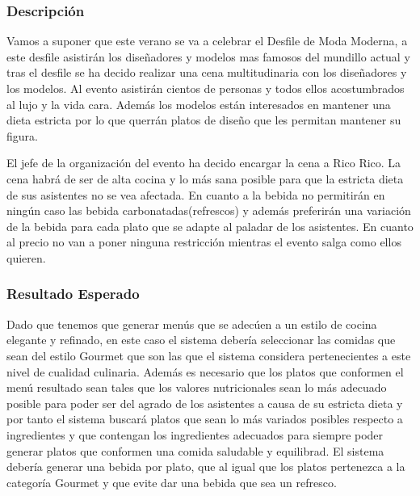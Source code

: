 \documentclass{article}
\begin{document}
\subsubsection{Descripción}
Vamos a suponer que este verano se va a celebrar el Desfile de Moda Moderna, a este desfile asistirán los diseñadores y modelos mas famosos del mundillo actual y tras el desfile se ha decido realizar una cena multitudinaria con los diseñadores y los modelos. Al evento asistirán cientos de personas y todos ellos acostumbrados al lujo y la vida cara. Además los modelos están interesados en mantener una dieta estricta por lo que querrán platos de diseño que les permitan mantener su figura.
\par
El jefe de la organización del evento ha decido encargar la cena a Rico Rico. La cena habrá de ser de alta cocina y lo más sana posible para que la estricta dieta de sus asistentes no se vea afectada. En cuanto a la bebida no permitirán en ningún caso las bebida carbonatadas(refrescos) y además preferirán una variación de la bebida para cada plato que se adapte al paladar de los asistentes. En cuanto al precio no van a poner ninguna restricción mientras el evento salga como ellos quieren.

\subsubsection{Resultado Esperado}
Dado que tenemos que generar menús que se adecúen a un estilo de cocina elegante y refinado, en este caso el sistema debería seleccionar las comidas que sean del estilo Gourmet que son las que el sistema considera pertenecientes a este nivel de cualidad culinaria. Además es necesario que los platos que conformen el menú resultado sean tales que los valores nutricionales sean lo más adecuado posible para poder ser del agrado de los asistentes a causa de su estricta dieta y por tanto el sistema buscará platos que sean lo más variados posibles respecto a ingredientes y que contengan los ingredientes adecuados para siempre poder generar platos que conformen una comida saludable y equilibrad. El sistema debería generar una bebida por plato, que al igual que los platos pertenezca a la categoría Gourmet y que evite dar una bebida que sea un refresco.
\end{document}
